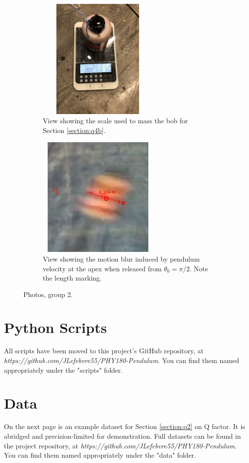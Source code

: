 \documentclass[12pt]{article}
\begin{document}
\pagebreak
\begin{figure}[h]
    \centering
    \begin{subfigure}[b]{0.48\textwidth}
        \centering
        \includegraphics[width=6cm,height=6cm,keepaspectratio,angle=270,origin=c]{scale.jpeg}
        \caption{View showing the scale used to mass the bob for Section \ref{section:q4b}.}
        \label{appendix:scale}
    \end{subfigure}
    \hfill
    \begin{subfigure}[b]{0.48\textwidth}
        \centering
        \includegraphics[width=6cm,height=6cm,keepaspectratio]{motionblur.png}
        \caption{View showing the motion blur induced by pendulum velocity at the apex when released from $\theta_0=\pi/2$. Note the length marking.}
        \label{appendix:motionblur}
    \end{subfigure}
    \hfill
    \caption{Photos, group 2.}
\end{figure}

\section{Python Scripts}
\label{appendix:scripts}
\noindent
All scripts have been moved to this project's GitHub repository, at \emph{https://github.com/JLefebvre55/PHY180-Pendulum}. You can find them named appropriately under the "scripts" folder.
\section{Data}
\noindent
On the next page is an example dataset for Section \ref{section:q2} on Q factor. It is abridged and precision-limited for demonstration. Full datasets can be found in the project repository, at \emph{https://github.com/JLefebvre55/PHY180-Pendulum}. You can find them named appropriately under the "data" folder.\medskip\\




\end{document}
